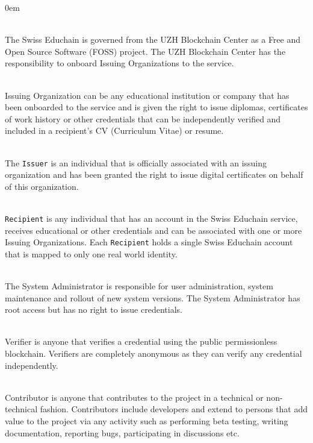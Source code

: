 \begin{description}
	\itemsep0em
	\item[Swiss Educhain Governance Body] \hfill \\
	The Swiss Educhain is governed from the UZH Blockchain Center \cite{noauthor_uzh_nodate} as a Free and Open Source Software (FOSS) project. The UZH Blockchain Center has the responsibility to onboard Issuing Organizations to the service.
	
	\item[Issuing Organization] \hfill \\
	Issuing Organization can be any educational institution or company that has been onboarded to the service and is given the right to issue diplomas, certificates of work history or other credentials that can be independently verified and included in a recipient's CV (Curriculum Vitae) or resume.
	
	\item[Issuer] \hfill \\
	The \texttt{Issuer} is an individual that is officially associated with an issuing organization and has been granted the right to issue digital certificates on behalf of this organization.
	
	\item[Recipient] \hfill \\
	\texttt{Recipient} is any individual that has an account in the Swiss Educhain service, receives educational or other credentials and can be associated with one or more Issuing Organizations. Each \texttt{Recipient} holds a single Swiss Educhain account that is mapped to only one real world identity.
	
	\item[System Administrator] \hfill \\
	The System Administrator is responsible for user administration, system maintenance and rollout of new system versions. The System Administrator has root access but has no right to issue credentials.
	
	
	\item[Verifier] \hfill \\
	Verifier is anyone that verifies a credential using the public permissionless blockchain. Verifiers are completely anonymous as they can verify any credential independently.
		
	\item[Contributor] \hfill \\
	Contributor is anyone that contributes to the project in a technical or non-technical fashion. Contributors include developers and extend to persons that add value to the project via any activity such as performing beta testing, writing documentation, reporting bugs, participating in discussions etc. 
	
\end{description}

